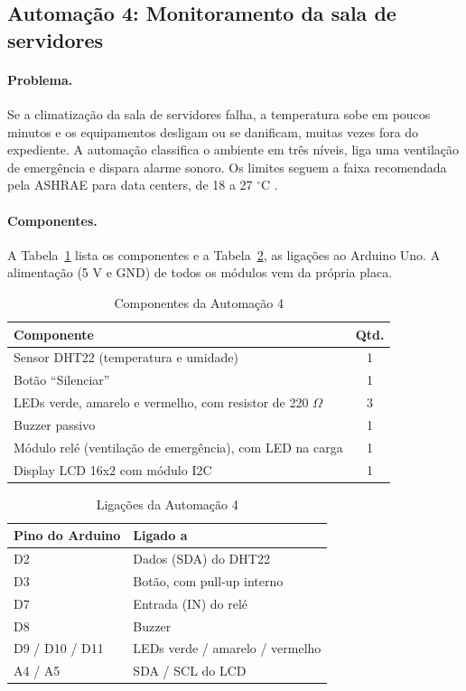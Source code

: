 \documentclass[12pt]{article}
\begin{document}
\subsection{Automação 4: Monitoramento da sala de servidores}\label{sub:a4}

\paragraph{Problema.} Se a climatização da sala de servidores falha, a temperatura sobe em poucos minutos e os equipamentos desligam ou se danificam, muitas vezes fora do expediente. A automação classifica o ambiente em três níveis, liga uma ventilação de emergência e dispara alarme sonoro. Os limites seguem a faixa recomendada pela ASHRAE para data centers, de 18 a 27 $^\circ$C \cite{ashrae2021}.

\paragraph{Componentes.} A Tabela~\ref{tab:comp4} lista os componentes e a Tabela~\ref{tab:lig4}, as ligações ao Arduino Uno. A alimentação (5 V e GND) de todos os módulos vem da própria placa.

\begin{table}[!htb]
\centering
\caption{Componentes da Automação 4}\label{tab:comp4}
\small
\begin{tabularx}{\textwidth}{Xc}
\toprule
Componente & Qtd. \\
\midrule
Sensor DHT22 (temperatura e umidade) & 1 \\
Botão ``Silenciar'' & 1 \\
LEDs verde, amarelo e vermelho, com resistor de 220 $\Omega$ & 3 \\
Buzzer passivo & 1 \\
Módulo relé (ventilação de emergência), com LED na carga & 1 \\
Display LCD 16x2 com módulo I2C & 1 \\
\bottomrule
\end{tabularx}
\end{table}

\begin{table}[!htb]
\centering
\caption{Ligações da Automação 4}\label{tab:lig4}
\small
\begin{tabularx}{\textwidth}{lX}
\toprule
Pino do Arduino & Ligado a \\
\midrule
D2 & Dados (SDA) do DHT22 \\
D3 & Botão, com pull-up interno \\
D7 & Entrada (IN) do relé \\
D8 & Buzzer \\
D9 / D10 / D11 & LEDs verde / amarelo / vermelho \\
A4 / A5 & SDA / SCL do LCD \\
\bottomrule
\end{tabularx}
\end{table}
\end{document}
